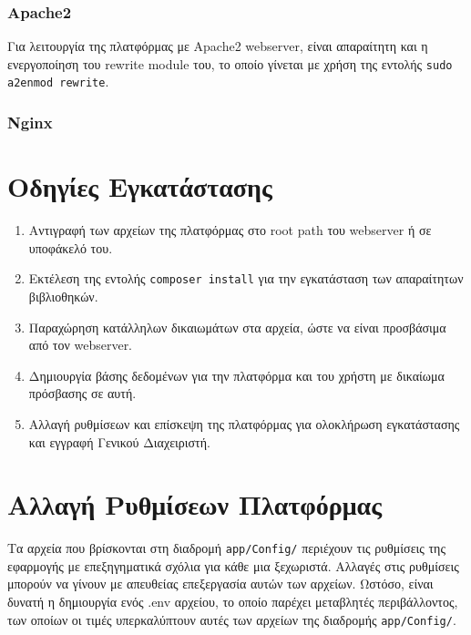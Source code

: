 \subsubsection{Apache2}


Για λειτουργία της πλατφόρμας με Apache2 webserver, είναι απαραίτητη και η ενεργοποίηση του rewrite module του, το οποίο γίνεται με χρήση της εντολής \verb!sudo a2enmod rewrite!.

\subsubsection{Nginx}


\section{Οδηγίες Εγκατάστασης}
\begin{enumerate}
	\item Αντιγραφή των αρχείων της πλατφόρμας στο root path του webserver ή σε υποφάκελό του.
	\item Εκτέλεση της εντολής \verb!composer install! για την εγκατάσταση των απαραίτητων βιβλιοθηκών.
	\item Παραχώρηση κατάλληλων δικαιωμάτων στα αρχεία, ώστε να είναι προσβάσιμα από τον webserver.
	\item Δημιουργία βάσης δεδομένων για την πλατφόρμα και του χρήστη με δικαίωμα πρόσβασης σε αυτή.
	\item Αλλαγή ρυθμίσεων και επίσκεψη της πλατφόρμας για ολοκλήρωση εγκατάστασης και εγγραφή Γενικού Διαχειριστή.
\end{enumerate}

\section{Αλλαγή Ρυθμίσεων Πλατφόρμας}
Τα αρχεία που βρίσκονται στη διαδρομή \verb!app/Config/! περιέχουν τις ρυθμίσεις της εφαρμογής με επεξηγηματικά σχόλια για κάθε μια ξεχωριστά. Αλλαγές στις ρυθμίσεις μπορούν να γίνουν με απευθείας επεξεργασία αυτών των αρχείων. Ωστόσο, είναι δυνατή η δημιουργία ενός .env αρχείου, το οποίο παρέχει μεταβλητές περιβάλλοντος, των οποίων οι τιμές υπερκαλύπτουν αυτές των αρχείων της διαδρομής \verb!app/Config/!.

